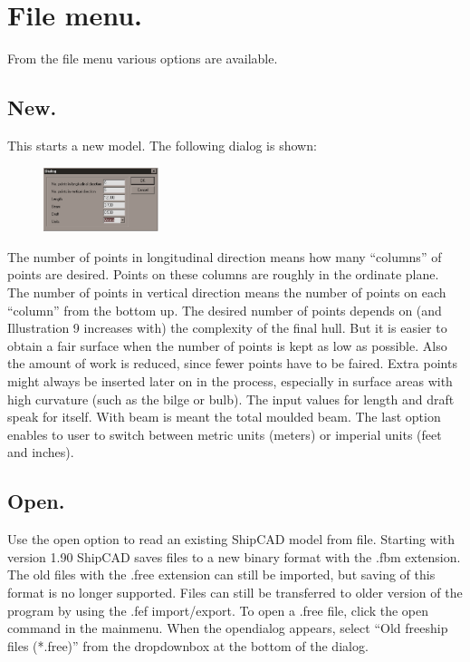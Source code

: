 \documentclass[12pt]{article}
\begin{document}
\pagebreak

\section{File menu.}
From the file menu various options are available.

\subsection{New.}
This starts a new model. The following dialog is shown:

\begin{figure}
        \centering
        \includegraphics[width=0.3\textwidth,natwidth=401,natheight=223]{filenewdialog.png}
        \caption{}
        \label{fig:filenew}
\end{figure}

The number of points in longitudinal direction means how many
“columns” of points are desired. Points on these columns are roughly
in the ordinate plane.  The number of points in vertical direction
means the number of points on each “column” from the bottom up. The
desired number of points depends on (and Illustration 9 increases
with) the complexity of the final hull. But it is easier to obtain a
fair surface when the number of points is kept as low as
possible. Also the amount of work is reduced, since fewer points have
to be faired. Extra points might always be inserted later on in the
process, especially in surface areas with high curvature (such as the
bilge or bulb). The input values for length and draft speak for
itself. With beam is meant the total moulded beam. The last option
enables to user to switch between metric units (meters) or imperial
units (feet and inches).

\subsection{Open.}
Use the open option to read an existing ShipCAD model from
file. Starting with version 1.90 ShipCAD saves files to a new binary
format with the .fbm extension. The old files with the .free extension
can still be imported, but saving of this format is no longer
supported. Files can still be transferred to older version of the
program by using the .fef import/export. To open a .free file, click
the open command in the mainmenu. When the opendialog appears, select
``Old freeship files (*.free)'' from the dropdownbox at the bottom of
the dialog.
\end{document}
